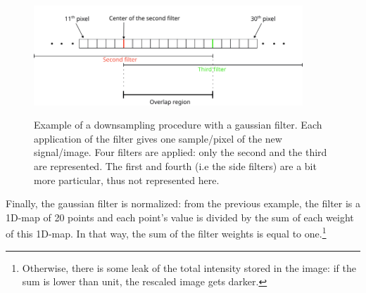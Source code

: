 \documentclass[11pt]{report}
\begin{document}
\begin{figure}[h!]
\caption{Example of a downsampling procedure with a gaussian filter. Each application of the filter gives one sample/pixel of the new signal/image. Four filters are applied: only the second and the third are represented. The first and fourth (i.e the side filters) are a bit more particular, thus not represented here.}
\centering
\includegraphics[width=0.9\textwidth]{dwsmpl-filter}
\label{fig:dwsmpl-filter}
\end{figure}

Finally, the gaussian filter is normalized: from the previous example, the filter is a 1D-map of 20 points and each point's value is divided by the sum of each weight of this 1D-map. In that way, the sum of the filter weights is equal to one.\footnote{Otherwise, there is some leak of the total intensity stored in the image: if the sum is lower than unit, the rescaled image gets darker.}
\end{document}
